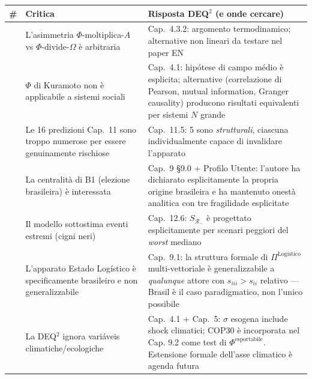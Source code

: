 {\def\LTcaptype{none} %
{\small\begin{longtable}[]{@{}
  >{\raggedright\arraybackslash}p{}
  >{\raggedright\arraybackslash}p{}
  >{\raggedright\arraybackslash}p{}@{}}
\toprule\noalign{}
\begin{minipage}[b]{\linewidth}\raggedright
\#
\end{minipage} & \begin{minipage}[b]{\linewidth}\raggedright
Critica
\end{minipage} & \begin{minipage}[b]{\linewidth}\raggedright
Risposta DEQ$^2$ (e onde cercare)
\end{minipage} \\
\midrule\noalign{}
\endhead
\bottomrule\noalign{}
\endlastfoot
1 & L'asimmetria \(\Phi\)-moltiplica-\(A\) vs \(\Phi\)-divide-\(\Omega\)
è arbitraria & Cap.~4.3.2: argomento termodinamico; alternative non
lineari da testare nel paper EN \\
2 & \(\Phi\) di Kuramoto non è applicabile a sistemi sociali & Cap.~4.1:
hipótese di campo médio è esplicita; alternative (correlazione di
Pearson, mutual information, Granger causality) producono risultati
equivalenti per sistemi \(N\) grande \\
3 & Le 16 predizioni Cap.~11 sono troppo numerose per essere
genuinamente rischiose & Cap.~11.5: 5 sono \emph{strutturali}, ciascuna
individualmente capace di invalidare l'apparato \\
4 & La centralità di B1 (elezione brasileira) è interessata & Cap.~9
\S{}9.0 + Profilo Utente: l'autore ha dichiarato esplicitamente la propria
origine brasileira e ha mantenuto onestà analitica con tre fragilidade
esplicitate \\
5 & Il modello sottostima eventi estremi (cigni neri) & Cap.~12.6:
\(S_{\mathcal{R}_-}\) è progettato esplicitamente per scenari peggiori
del \emph{worst} mediano \\
6 & L'apparato Estado Logístico è specificamente brasileiro e non
generalizzabile & Cap.~9.1: la struttura formale di
\(\Pi^{\text{Logístico}}\) multi-vettoriale è generalizzabile a
\emph{qualunque} attore con \(s_{iii} > s_{ii}\) relativo --- Brasil è
il caso paradigmatico, non l'unico possibile \\
7 & La DEQ$^2$ ignora variáveis climatiche/ecologiche & Cap.~4.1 + Cap.~5:
\(\sigma\) esogena include shock climatici; COP30 è incorporata nel Cap.
9.2 come test di \(\Phi^{\text{esportabile}}\). Estensione formale
dell'asse climatico è agenda futura \\
\end{longtable}}
}


